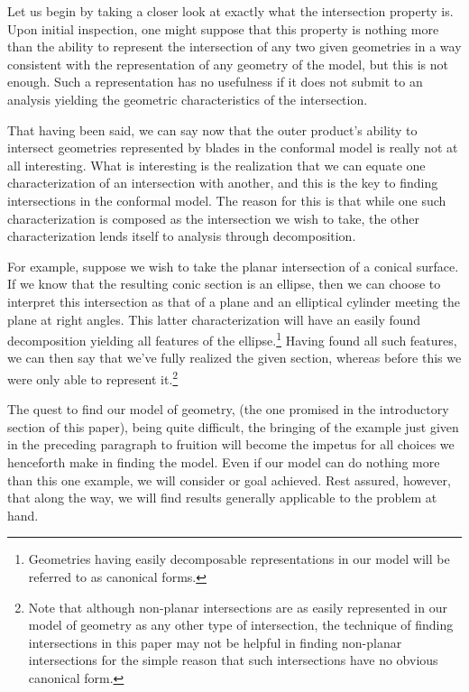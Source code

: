\documentclass{birkjour}
\theoremstyle{definition}
\theoremstyle{remark}
\numberwithin{equation}{section}
\begin{document}
Let us begin by taking a closer look at exactly what the intersection property is.
Upon initial inspection, one might suppose that this property is nothing more than
the ability to represent the intersection of any two given geometries in a way consistent
with the representation of any geometry of the model, but this is not
enough.  Such a representation has no usefulness if it does not submit to an
analysis yielding the geometric characteristics of the intersection.

That having been said, we can say now that the outer product's ability to intersect geometries represented
by blades in the conformal model is really not at all interesting.  What is interesting
is the realization that we can equate one characterization of an intersection
with another, and this is the key to finding intersections in the conformal model.
The reason for this is that while one such characterization is composed as the
intersection we wish to take, the other characterization lends itself to
analysis through decomposition.

For example, suppose we wish to take the planar intersection of a conical surface.
If we know that the resulting conic section is an ellipse, then we can choose to
interpret this intersection as that of a plane and an elliptical cylinder meeting
the plane at right angles.  This latter characterization will have an easily found decomposition
yielding all features of the ellipse.\footnote{Geometries having easily decomposable
representations in our model will be referred to as canonical forms.}
Having found all such features, we can then say that we've
fully realized the given section, whereas before this we were only able to
represent it.\footnote{Note that although non-planar intersections are as easily
represented in our model of geometry as any other type of intersection,
the technique of finding intersections in this paper
may not be helpful in finding non-planar intersections for the simple reason that such intersections
have no obvious canonical form.}

The quest to find our model of geometry, (the one promised in the introductory section of
this paper), being quite difficult, the bringing of the example just given in the preceding paragraph
to fruition will become the impetus for all choices we henceforth make in finding the model.
Even if our model can do nothing more than this one example, we will consider or goal achieved.
Rest assured, however, that along the way, we will find results generally applicable to the problem at hand.
\end{document}
